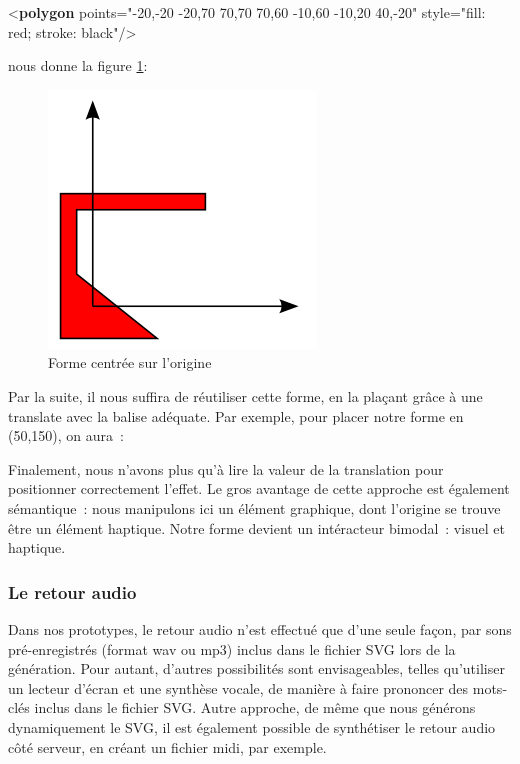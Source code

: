 \documentclass[
]{book}
\newenvironment{Shaded}{\begin{snugshade}}{\end{snugshade}}
\newcommand{\KeywordTok}[1]{\textcolor[rgb]{0.13,0.29,0.53}{\textbf{#1}}}
\newcommand{\NormalTok}[1]{#1}
\newcommand{\OtherTok}[1]{\textcolor[rgb]{0.56,0.35,0.01}{#1}}
\newcommand{\StringTok}[1]{\textcolor[rgb]{0.31,0.60,0.02}{#1}}
\begin{document}
\begin{Shaded}
\begin{Highlighting}[]
\NormalTok{\textless{}}\KeywordTok{polygon}\OtherTok{ points=}\StringTok{"{-}20,{-}20 {-}20,70 70,70 70,60 {-}10,60 {-}10,20 40,{-}20"}
\OtherTok{         style=}\StringTok{"fill: red; stroke: black"}\NormalTok{/\textgreater{}}
\end{Highlighting}
\end{Shaded}

nous donne la figure \ref{fig:centre2}:

\begin{figure}
\centering
\includegraphics{img/centre2.png}
\caption{\label{fig:centre2}Forme centrée sur l'origine}
\end{figure}

Par la suite, il nous suffira de réutiliser cette forme, en la plaçant
grâce à une translate avec la balise adéquate. Par exemple, pour placer notre
forme en (50,150), on aura~:

Finalement, nous n'avons plus qu'à lire la valeur de la translation pour
positionner correctement l'effet. Le gros avantage de cette approche est
également sémantique~: nous manipulons ici un élément graphique, dont
l'origine se trouve être un élément haptique. Notre forme devient un
intéracteur bimodal~: visuel et haptique.

\hypertarget{le-retour-audio}{%
\subsubsection{Le retour audio}\label{le-retour-audio}}

Dans nos prototypes, le retour audio n'est effectué que d'une seule façon,
par sons pré-enregistrés (format wav ou mp3) inclus dans le fichier SVG lors
de la génération. Pour autant, d'autres possibilités sont envisageables,
telles qu'utiliser un lecteur d'écran et une synthèse vocale, de manière à
faire prononcer des mots-clés inclus dans le fichier SVG. Autre approche, de
même que nous générons dynamiquement le SVG, il est également possible de
synthétiser le retour audio côté serveur, en créant un fichier midi, par
exemple.
\end{document}
